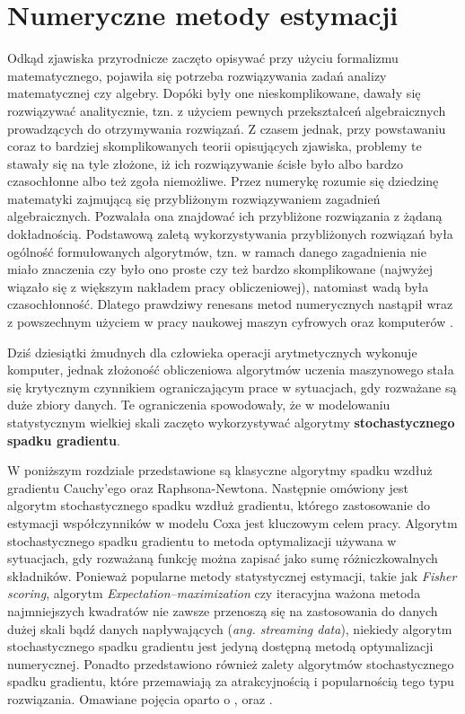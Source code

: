 \chapter{Numeryczne metody estymacji}\label{numPAJ}

Odkąd zjawiska przyrodnicze zaczęto opisywać przy użyciu formalizmu matematycznego,
pojawiła się potrzeba rozwiązywania zadań analizy matematycznej czy algebry. Dopóki były
one nieskomplikowane, dawały się rozwiązywać analitycznie, tzn. z użyciem pewnych
przekształceń algebraicznych prowadzących do otrzymywania rozwiązań. Z czasem jednak, przy powstawaniu coraz to bardziej skomplikowanych teorii
opisujących zjawiska, problemy te stawały się na tyle złożone, iż ich rozwiązywanie ścisłe
było albo bardzo czasochłonne albo też zgoła niemożliwe. Przez numerykę rozumie się dziedzinę matematyki
zajmującą się przybliżonym rozwiązywaniem zagadnień algebraicznych. Pozwalała ona znajdować ich 
przybliżone rozwiązania z żądaną dokładnością. Podstawową zaletą wykorzystywania przybliżonych rozwiązań była ogólność
formułowanych algorytmów, tzn. w ramach danego zagadnienia nie miało znaczenia czy było
ono proste czy też bardzo skomplikowane (najwyżej wiązało się z większym nakładem pracy
obliczeniowej), natomiast wadą była czasochłonność. Dlatego prawdziwy renesans metod
numerycznych nastąpił wraz z powszechnym użyciem w pracy naukowej maszyn cyfrowych oraz komputerów \citep{milewski}. 

Dziś dziesiątki żmudnych dla człowieka operacji
arytmetycznych wykonuje komputer, jednak złożoność obliczeniowa algorytmów uczenia maszynowego stała się krytycznym czynnikiem ograniczającym prace w sytuacjach, gdy rozważane są duże zbiory danych. Te ograniczenia spowodowały, że w modelowaniu statystycznym wielkiej skali zaczęto wykorzystywać algorytmy \textbf{stochastycznego spadku gradientu}. 

W poniższym rozdziale przedstawione są klasyczne algorytmy spadku wzdłuż gradientu Cauchy'ego oraz Raphsona-Newtona. Następnie omówiony jest algorytm stochastycznego spadku wzdłuż gradientu, którego zastosowanie do estymacji współczynników w modelu Coxa jest kluczowym celem pracy. Algorytm stochastycznego spadku gradientu to metoda optymalizacji używana w sytuacjach, gdy rozważaną funkcję można zapisać jako sumę różniczkowalnych składników. Ponieważ popularne metody statystycznej estymacji, takie jak \textit{Fisher scoring}, algorytm \textit{Expectation–maximization} czy iteracyjna ważona metoda najmniejszych kwadratów \citep{fisher3,dempster,greenPJ} nie zawsze przenoszą się na zastosowania do danych dużej skali bądź danych napływających (\textit{ang. streaming data}), niekiedy algorytm stochastycznego spadku gradientu jest jedyną dostępną metodą optymalizacji numerycznej. Ponadto przedstawiono również zalety algorytmów stochastycznego spadku gradientu, które przemawiają za atrakcyjnością i popularnością tego typu rozwiązania. Omawiane pojęcia oparto o \cite{bott1,bott2}, \cite{kotlowski} oraz \cite{fortuna}.

